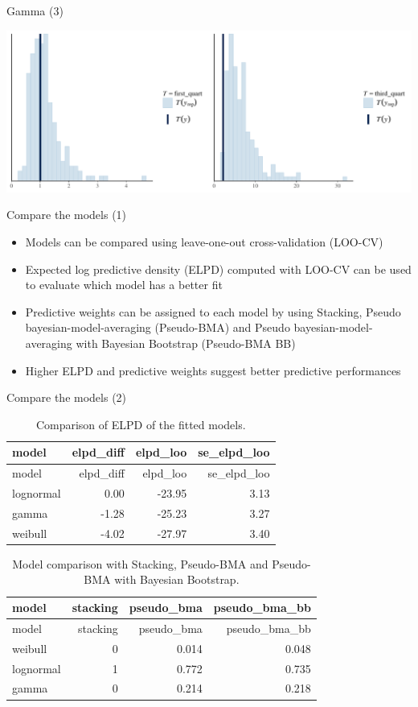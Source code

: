 \documentclass[ignorenonframetext,a4paper]{beamer}
\begin{document}
\begin{frame}{Gamma (3)}

\includegraphics{DB_presentation_case_study_files/figure-beamer/unnamed-chunk-22-1.pdf}

\end{frame}

\begin{frame}{Compare the models (1)}

\begin{itemize}
\setlength\itemsep{1em}
  \item{Models can be compared using leave-one-out cross-validation
        (LOO-CV)}
  \item{Expected log predictive density (ELPD) computed with LOO-CV
        can be used to evaluate which model has a better fit}
  \item{Predictive weights can be assigned to each model by using
        Stacking, Pseudo bayesian-model-averaging (Pseudo-BMA) and
        Pseudo bayesian-model-averaging with Bayesian Bootstrap
        (Pseudo-BMA BB)}
  \item{Higher ELPD and predictive weights suggest better 
        predictive performances}
\end{itemize}

\end{frame}

\begin{frame}{Compare the models (2)}

\scriptsize

\begin{longtable}[]{@{}lrrr@{}}
\caption{Comparison of ELPD of the fitted models.}\tabularnewline
\toprule
model & elpd\_diff & elpd\_loo & se\_elpd\_loo\tabularnewline
\midrule
\endfirsthead
\toprule
model & elpd\_diff & elpd\_loo & se\_elpd\_loo\tabularnewline
\midrule
\endhead
lognormal & 0.00 & -23.95 & 3.13\tabularnewline
gamma & -1.28 & -25.23 & 3.27\tabularnewline
weibull & -4.02 & -27.97 & 3.40\tabularnewline
\bottomrule
\end{longtable}

\begin{longtable}[]{@{}lrrr@{}}
\caption{Model comparison with Stacking, Pseudo-BMA and Pseudo-BMA with
Bayesian Bootstrap.}\tabularnewline
\toprule
model & stacking & pseudo\_bma & pseudo\_bma\_bb\tabularnewline
\midrule
\endfirsthead
\toprule
model & stacking & pseudo\_bma & pseudo\_bma\_bb\tabularnewline
\midrule
\endhead
weibull & 0 & 0.014 & 0.048\tabularnewline
lognormal & 1 & 0.772 & 0.735\tabularnewline
gamma & 0 & 0.214 & 0.218\tabularnewline
\bottomrule
\end{longtable}

\end{frame}
\end{document}
